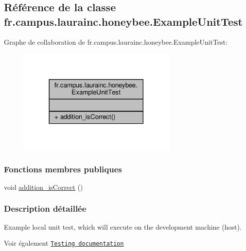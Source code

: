 \hypertarget{classfr_1_1campus_1_1laurainc_1_1honeybee_1_1_example_unit_test}{}\subsection{Référence de la classe fr.\+campus.\+laurainc.\+honeybee.\+Example\+Unit\+Test}
\label{classfr_1_1campus_1_1laurainc_1_1honeybee_1_1_example_unit_test}


Graphe de collaboration de fr.\+campus.\+laurainc.\+honeybee.\+Example\+Unit\+Test\+:\nopagebreak
\begin{figure}[H]
\begin{center}
\leavevmode
\includegraphics[width=225pt]{classfr_1_1campus_1_1laurainc_1_1honeybee_1_1_example_unit_test__coll__graph}
\end{center}
\end{figure}
\subsubsection*{Fonctions membres publiques}
\begin{DoxyCompactItemize}
\item 
void \hyperlink{classfr_1_1campus_1_1laurainc_1_1honeybee_1_1_example_unit_test_a77a58b717ed25d15b8ed9c20f763ad29}{addition\+\_\+is\+Correct} ()
\end{DoxyCompactItemize}


\subsubsection{Description détaillée}
Example local unit test, which will execute on the development machine (host).

\begin{DoxySeeAlso}{Voir également}
\href{http://d.android.com/tools/testing}{\tt Testing documentation} 
\end{DoxySeeAlso}


